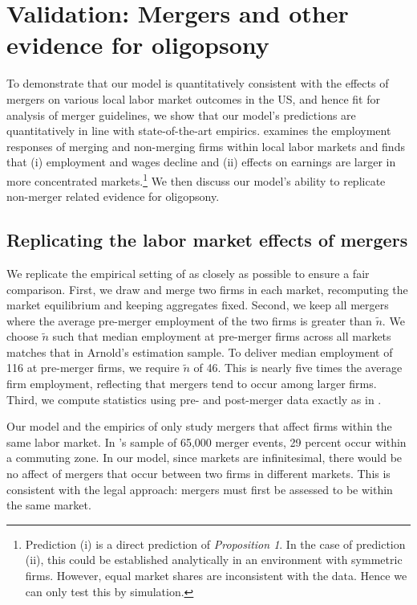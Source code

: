 \documentclass[12pt]{article}
\theoremstyle{prop}
\begin{document}
 \section{Validation: Mergers and other evidence for oligopsony}\label{sec:validation}

To demonstrate that our model is quantitatively consistent with the effects of mergers on various local labor market outcomes in the US, and hence fit for analysis of merger guidelines, we show that our model's predictions are quantitatively in line with  state-of-the-art empirics. 
\citet{Arnold}  examines the employment responses of merging and non-merging firms within local labor markets and finds that (i) employment and wages decline and (ii) effects on earnings are larger in more concentrated markets.\footnote{
	Prediction (i) is a direct prediction of \emph{Proposition 1}.
	In the case of prediction (ii), this could be established analytically in an environment with symmetric firms.
	However, equal market shares are inconsistent with the data. Hence we can only test this by simulation.} 
We then discuss our model's ability to replicate non-merger related evidence for oligopsony.

 
    
\subsection{Replicating the labor market effects of mergers}

We replicate the empirical setting of \citet{Arnold} as closely as possible to ensure a fair comparison.
First, we draw and merge two firms in each market, recomputing the market equilibrium and keeping aggregates fixed.
Second, we keep all mergers where the average pre-merger employment of the two firms is greater than $\widetilde{n}$. 
We choose $\widetilde{n}$ such that median employment at pre-merger firms across all markets matches that in Arnold's estimation sample.
To deliver median employment of 116 at pre-merger firms, we require $\widetilde{n}$ of 46. 
This is nearly five times the average firm employment, reflecting that mergers tend to occur among larger firms.
Third, we compute statistics using pre- and post-merger data exactly as in \citet{Arnold}.

Our model and the empirics of \citet{Arnold} only study mergers that affect firms within the same labor market. 
In \citet{Arnold}'s sample of 65,000 merger events, 29 percent occur within a commuting zone. 
In our model, since markets are infinitesimal, there would be no affect of mergers that occur between two firms in different markets. 
This is consistent with the legal approach: mergers must first be assessed to be within the same market. 
\end{document}
